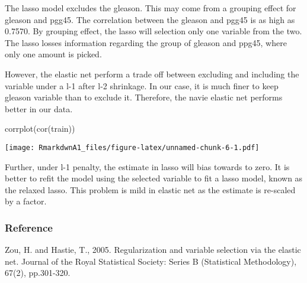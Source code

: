 \documentclass[
]{article}
\newenvironment{Shaded}{\begin{snugshade}}{\end{snugshade}}
\newcommand{\FunctionTok}[1]{\textcolor[rgb]{0.00,0.00,0.00}{#1}}
\newcommand{\NormalTok}[1]{#1}
\begin{document}
The lasso model excludes the gleason. This may come from a grouping
effect for gleason and pgg45. The correlation between the gleason and
pgg45 is as high as 0.7570. By grouping effect, the lasso will selection
only one variable from the two. The lasso losses information regarding
the group of gleason and ppg45, where only one amount is picked.

However, the elastic net perform a trade off between excluding and
including the variable under a l-1 after l-2 shrinkage. In our case, it
is much finer to keep gleason variable than to exclude it. Therefore,
the navie elastic net performs better in our data.

\begin{Shaded}
\begin{Highlighting}[]
\FunctionTok{corrplot}\NormalTok{(}\FunctionTok{cor}\NormalTok{(train))}
\end{Highlighting}
\end{Shaded}

\texttt{[image: RmarkdwnA1\_files/figure-latex/unnamed-chunk-6-1.pdf]}

Further, under l-1 penalty, the estimate in lasso will bias towards to
zero. It is better to refit the model using the selected variable to fit
a lasso model, known as the relaxed lasso. This problem is mild in
elastic net as the estimate is re-scaled by a factor.

\hypertarget{reference}{%
\subsubsection{Reference}\label{reference}}

Zou, H. and Hastie, T., 2005. Regularization and variable selection via
the elastic net. Journal of the Royal Statistical Society: Series B
(Statistical Methodology), 67(2), pp.301-320.
\end{document}
